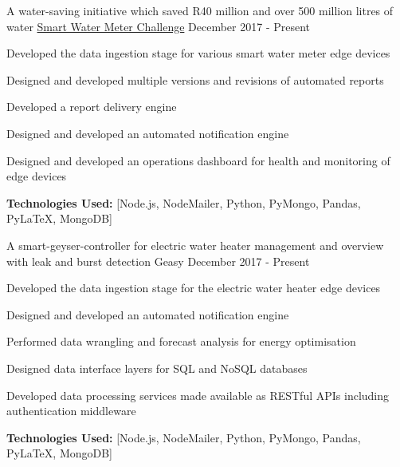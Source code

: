
\begin{cventries}
    
  \cventry
    {A water-saving initiative which saved R40 million and over 500 million litres of water} %
    {\href{https://www.bridgiot.co.za/initiatives/smart-water-meter-challenge/}{Smart Water Meter Challenge}} %
    {} %
    {December 2017 - Present} %
    {
      \begin{cvitems} %
        \item {Developed the data ingestion stage for various smart water meter edge devices}
        \item {Designed and developed multiple versions and revisions of automated reports}
        \item {Developed a report delivery engine}
        \item {Designed and developed an automated notification engine}
        \item {Designed and developed an operations dashboard for health and monitoring of edge devices}
		\item {\textbf{Technologies Used:} [Node.js, NodeMailer, Python, PyMongo, Pandas, PyLaTeX, MongoDB]}
      \end{cvitems}
    }

  \cventry
    {A smart-geyser-controller for electric water heater management and overview with leak and burst detection} %
    {Geasy} %
    {} %
    {December 2017 - Present} %
    {
      \begin{cvitems} %
        \item {Developed the data ingestion stage for the electric water heater edge devices}
        \item {Designed and developed an automated notification engine}
        \item {Performed data wrangling and forecast analysis for energy optimisation}
        \item {Designed data interface layers for SQL and NoSQL databases}
        \item {Developed data processing services made available as RESTful APIs including authentication middleware}
		\item {\textbf{Technologies Used:} [Node.js, NodeMailer, Python, PyMongo, Pandas, PyLaTeX, MongoDB]}
      \end{cvitems}
    }


\end{cventries}
